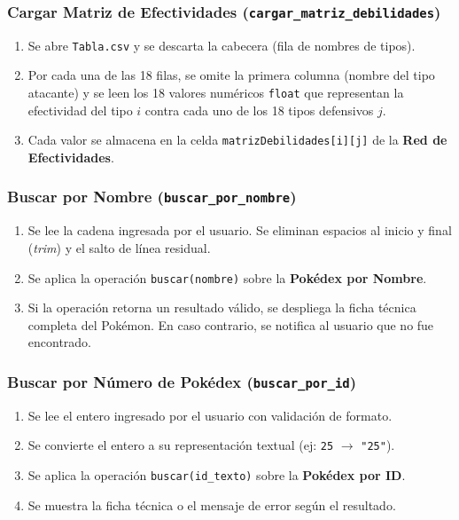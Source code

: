 \documentclass[12pt, letterpaper]{article}
\begin{document}
\subsubsection{Cargar Matriz de Efectividades (\texttt{cargar\_matriz\_debilidades})}

\begin{enumerate}
    \item Se abre \texttt{Tabla.csv} y se descarta la cabecera (fila de nombres de tipos).
    \item Por cada una de las 18 filas, se omite la primera columna (nombre del tipo atacante) y se leen los 18 valores numéricos \texttt{float} que representan la efectividad del tipo $i$ contra cada uno de los 18 tipos defensivos $j$.
    \item Cada valor se almacena en la celda \texttt{matrizDebilidades[i][j]} de la \textbf{Red de Efectividades}.
\end{enumerate}

\subsubsection{Buscar por Nombre (\texttt{buscar\_por\_nombre})}

\begin{enumerate}
    \item Se lee la cadena ingresada por el usuario. Se eliminan espacios al inicio y final (\emph{trim}) y el salto de línea residual.
    \item Se aplica la operación \texttt{buscar(nombre)} sobre la \textbf{Pokédex por Nombre}.
    \item Si la operación retorna un resultado válido, se despliega la ficha técnica completa del Pokémon. En caso contrario, se notifica al usuario que no fue encontrado.
\end{enumerate}

\subsubsection{Buscar por Número de Pokédex (\texttt{buscar\_por\_id})}

\begin{enumerate}
    \item Se lee el entero ingresado por el usuario con validación de formato.
    \item Se convierte el entero a su representación textual (ej: \texttt{25} $\rightarrow$ \texttt{"25"}).
    \item Se aplica la operación \texttt{buscar(id\_texto)} sobre la \textbf{Pokédex por ID}.
    \item Se muestra la ficha técnica o el mensaje de error según el resultado.
\end{enumerate}
\end{document}
